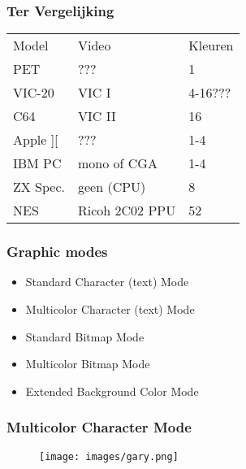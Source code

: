 \documentclass[aspectratio=43]{uva-inf-presentation}
\begin{document}

\begin{frame}
\frametitle{Ter Vergelijking}

\begin{tabular}{|l|l|l|}
\hline Model & Video & Kleuren \\
PET & ??? & 1 \\
VIC-20 & VIC I & 4-16??? \\
C64 & VIC II & 16 \\
Apple ][ & ??? & 1-4 \\
IBM PC & mono of CGA & 1-4 \\
ZX Spec. & geen (CPU) & 8 \\ \hline
NES & Ricoh 2C02 PPU & 52 \\ \hline
\end{tabular}

\end{frame}

%
%
%


\begin{frame}
\frametitle{Graphic modes}

\begin{itemize}
\item Standard Character (text) Mode
\item Multicolor Character (text) Mode
\item Standard Bitmap Mode
\item Multicolor Bitmap Mode
\item Extended Background Color Mode
\end{itemize}

\end{frame}


\begin{frame}
\frametitle{Multicolor Character Mode}

\begin{figure}
\texttt{[image: images/gary.png]}
\end{figure}

\end{frame}
\end{document}
